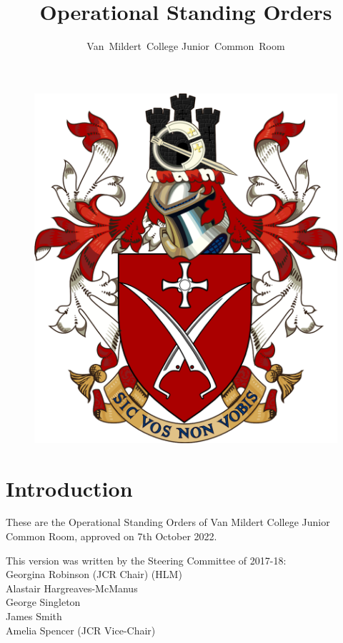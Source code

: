 \documentclass[12pt]{article}
\title{Operational Standing Orders}
\author{Van~Mildert~College Junior~Common~Room}
\date{\thedate}
\newcommand{\thedate}{7th October 2022}
\begin{document}
\begin{titlepage}  %
    \maketitle
    \begin{figure}[h]
    \includegraphics[scale=0.25]{arms}  %
    \centering
    \end{figure}
    \thispagestyle{empty}
\end{titlepage}

\setcounter{page}{2}  %
\section*{Introduction}
These are the Operational Standing Orders of Van Mildert College Junior Common Room, approved on \thedate.

This version was written by the Steering Committee of 2017-18:\\
\hspace*{2cm}Georgina Robinson (JCR Chair) (HLM)\\
\hspace*{2cm}Alastair Hargreaves-McManus\\
\hspace*{2cm}George Singleton\\
\hspace*{2cm}James Smith\\
\hspace*{2cm}Amelia Spencer (JCR Vice-Chair)
\end{document}
